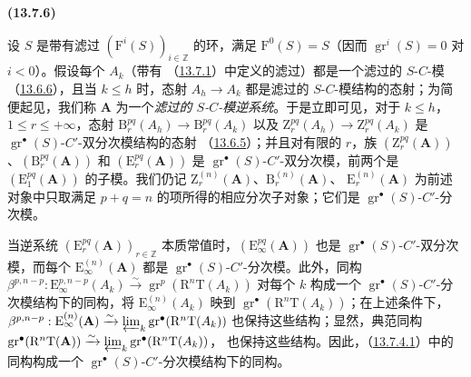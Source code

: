 \documentclass[UTF8,fontset=none,11pt,oneside,openany]{ctexbook}
\newenvironment{env}[1][]{%
  \par\medskip\noindent\textbf{(#1)}\ %
}{\par}
\let\EGAOriginalLabel\label
\renewcommand{\label}[1]{\phantomsection\EGAOriginalLabel{#1}}
\begin{document}
\begin{env}[13.7.6]
\label{0.13.7.6-fr}
设 $S$ 是带有滤过
$(\mathrm F^i(S))_{i\in\mathbb Z}$ 的环，满足 $\mathrm F^0(S)=S$（因而
$\operatorname{gr}^i(S)=0$ 对 $i<0$）。假设每个 $A_k$（带有
（\hyperref[0.13.7.1-fr]{13.7.1}）中定义的滤过）都是一个滤过的
$S$-$C$-模（\hyperref[0.13.6.6-fr]{13.6.6}），且当 $k\leq h$ 时，态射 $A_h\to A_k$ 都是滤过的
$S$-$C$-模结构的态射；为简便起见，我们称 $\mathbf A$ 为一个\emph{滤过的
$S$-$C$-模逆系统}。于是立即可见，对于 $k\leq h$，$1\leq r\leq+\infty$，态射
$\mathrm B_r^{pq}(A_h)\to\mathrm B_r^{pq}(A_k)$ 以及
$\mathrm Z_r^{pq}(A_h)\to\mathrm Z_r^{pq}(A_k)$ 是
$\operatorname{gr}^\bullet(S)$-$C'$-双分次模结构的态射
（\hyperref[0.13.6.5-fr]{13.6.5}）；并且对有限的 $r$，族
$(\mathrm Z_r^{pq}(\mathbf A))$、$(\mathrm B_r^{pq}(\mathbf A))$ 和
$(\mathrm E_r^{pq}(\mathbf A))$ 是
$\operatorname{gr}^\bullet(S)$-$C'$-双分次模，前两个是
$(\mathrm E_1^{pq}(\mathbf A))$ 的子模。我们仍记
$\mathrm Z_r^{(n)}(\mathbf A)$、$\mathrm B_r^{(n)}(\mathbf A)$、
$\mathrm E_r^{(n)}(\mathbf A)$ 为前述对象中只取满足 $p+q=n$ 的项所得的相应分次子对象；它们是
$\operatorname{gr}^\bullet(S)$-$C'$-分次模。

当逆系统 $(\mathrm E_r^{pq}(\mathbf A))_{r\in\mathbb Z}$ 本质常值时，$(\mathrm E_\infty^{pq}(\mathbf A))$ 也是
$\operatorname{gr}^\bullet(S)$-$C'$-双分次模，而每个
$\mathrm E_\infty^{(n)}(\mathbf A)$ 都是
$\operatorname{gr}^\bullet(S)$-$C'$-分次模。此外，同构
$\beta^{p,n-p}:\mathrm E_\infty^{p,n-p}(A_k)\xrightarrow{\sim}
\operatorname{gr}^p(\mathrm R^n\mathrm T(A_k))$ 对每个
$k$ 构成一个 $\operatorname{gr}^\bullet(S)$-$C'$-分次模结构下的同构，将
$\mathrm E_\infty^{(n)}(A_k)$ 映到
$\operatorname{gr}^\bullet(\mathrm R^n\mathrm T(A_k))$；在上述条件下，
$\beta^{p,n-p}:\mathrm E_\infty^{(n)}(\mathbf A)\xrightarrow{\sim}
\varprojlim_k\operatorname{gr}^\bullet(\mathrm R^n\mathrm T(A_k))$
也保持这些结构；显然，典范同构
$\operatorname{gr}^\bullet(\mathrm R^n\mathrm T(\mathbf A))
\xrightarrow{\sim}
\varprojlim_k\operatorname{gr}^\bullet(\mathrm R^n\mathrm T(A_k))$，
也保持这些结构。因此，（\hyperref[0.13.7.4.1-fr]{13.7.4.1}）中的同构构成一个
$\operatorname{gr}^\bullet(S)$-$C'$-分次模结构下的同构。
\end{env}
\end{document}
